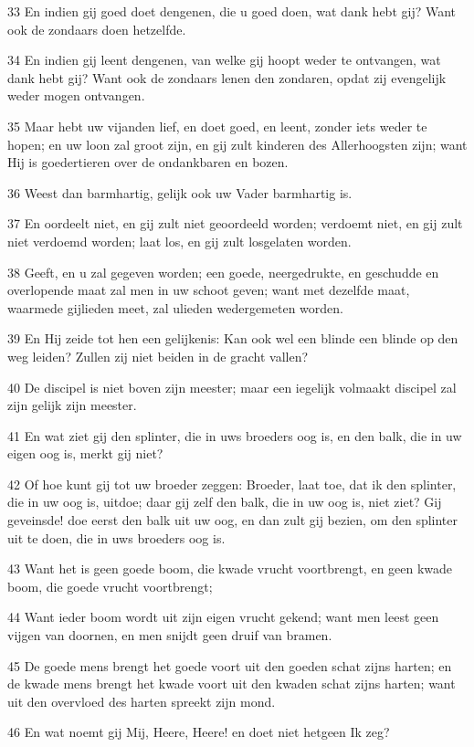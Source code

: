 \par 33 En indien gij goed doet dengenen, die u goed doen, wat dank hebt gij? Want ook de zondaars doen hetzelfde.
\par 34 En indien gij leent dengenen, van welke gij hoopt weder te ontvangen, wat dank hebt gij? Want ook de zondaars lenen den zondaren, opdat zij evengelijk weder mogen ontvangen.
\par 35 Maar hebt uw vijanden lief, en doet goed, en leent, zonder iets weder te hopen; en uw loon zal groot zijn, en gij zult kinderen des Allerhoogsten zijn; want Hij is goedertieren over de ondankbaren en bozen.
\par 36 Weest dan barmhartig, gelijk ook uw Vader barmhartig is.
\par 37 En oordeelt niet, en gij zult niet geoordeeld worden; verdoemt niet, en gij zult niet verdoemd worden; laat los, en gij zult losgelaten worden.
\par 38 Geeft, en u zal gegeven worden; een goede, neergedrukte, en geschudde en overlopende maat zal men in uw schoot geven; want met dezelfde maat, waarmede gijlieden meet, zal ulieden wedergemeten worden.
\par 39 En Hij zeide tot hen een gelijkenis: Kan ook wel een blinde een blinde op den weg leiden? Zullen zij niet beiden in de gracht vallen?
\par 40 De discipel is niet boven zijn meester; maar een iegelijk volmaakt discipel zal zijn gelijk zijn meester.
\par 41 En wat ziet gij den splinter, die in uws broeders oog is, en den balk, die in uw eigen oog is, merkt gij niet?
\par 42 Of hoe kunt gij tot uw broeder zeggen: Broeder, laat toe, dat ik den splinter, die in uw oog is, uitdoe; daar gij zelf den balk, die in uw oog is, niet ziet? Gij geveinsde! doe eerst den balk uit uw oog, en dan zult gij bezien, om den splinter uit te doen, die in uws broeders oog is.
\par 43 Want het is geen goede boom, die kwade vrucht voortbrengt, en geen kwade boom, die goede vrucht voortbrengt;
\par 44 Want ieder boom wordt uit zijn eigen vrucht gekend; want men leest geen vijgen van doornen, en men snijdt geen druif van bramen.
\par 45 De goede mens brengt het goede voort uit den goeden schat zijns harten; en de kwade mens brengt het kwade voort uit den kwaden schat zijns harten; want uit den overvloed des harten spreekt zijn mond.
\par 46 En wat noemt gij Mij, Heere, Heere! en doet niet hetgeen Ik zeg?
